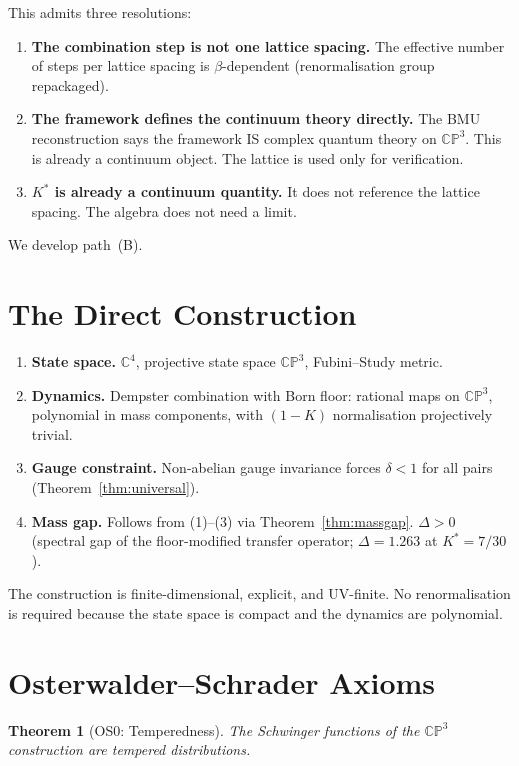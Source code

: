 \documentclass[11pt,a4paper]{article}
\newtheorem{theorem}{Theorem}[section]
\theoremstyle{definition}
\theoremstyle{remark}
\newcommand{\CP}{\mathbb{CP}}
\newcommand{\C}{\mathbb{C}}
\begin{document}
This admits three resolutions:
\begin{enumerate}
\item[(A)] \textbf{The combination step is not one lattice spacing.} The effective number of steps per lattice spacing is $\beta$-dependent (renormalisation group repackaged).
\item[(B)] \textbf{The framework defines the continuum theory directly.} The BMU reconstruction says the framework IS complex quantum theory on $\CP^3$. This is already a continuum object. The lattice is used only for verification.
\item[(C)] \textbf{$K^*$ is already a continuum quantity.} It does not reference the lattice spacing. The algebra does not need a limit.
\end{enumerate}
We develop path~(B).


\section{The Direct Construction}\label{sec:direct}

\begin{enumerate}[nosep]
\item \textbf{State space.} $\C^4$, projective state space $\CP^3$, Fubini--Study metric.
\item \textbf{Dynamics.} Dempster combination with Born floor: rational maps on $\CP^3$, polynomial in mass components, with $(1-K)$ normalisation projectively trivial.
\item \textbf{Gauge constraint.} Non-abelian gauge invariance forces $\delta<1$ for all pairs (Theorem~\ref{thm:universal}).
\item \textbf{Mass gap.} Follows from (1)--(3) via Theorem~\ref{thm:massgap}. $\Delta>0$ (spectral gap of the floor-modified transfer operator; $\Delta=1.263$ at $K^*=7/30$).
\end{enumerate}
The construction is finite-dimensional, explicit, and UV-finite. No renormalisation is required because the state space is compact and the dynamics are polynomial.


\section{Osterwalder--Schrader Axioms}\label{sec:OS}

\begin{theorem}[OS0: Temperedness]\label{thm:OS0}
The Schwinger functions of the $\CP^3$ construction are tempered distributions.
\end{theorem}
\end{document}
